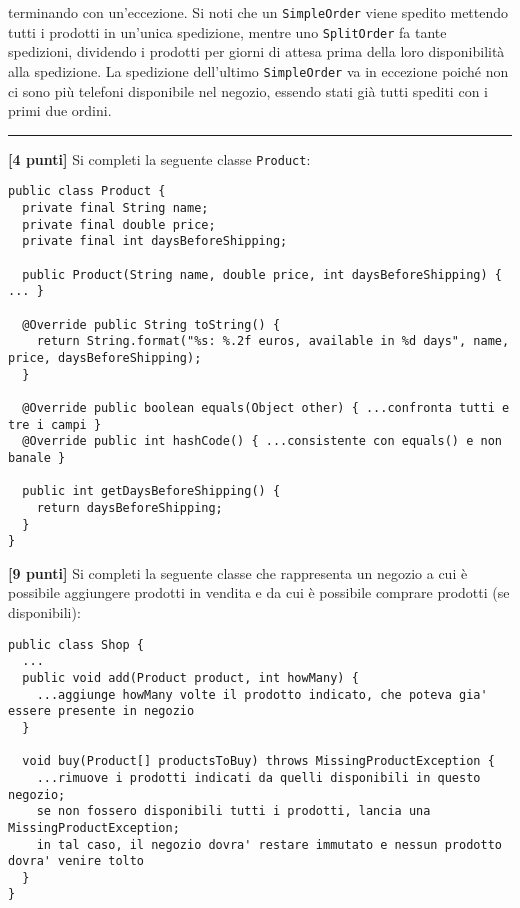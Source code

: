 \documentclass{article}[10pt]
\newcounter{esnu}
\newenvironment{esercizio}{\medskip \noindent {\bf Esercizio\addtocounter{esnu}{1} \arabic{esnu}}}{}
\begin{document}
\noindent
terminando con un'eccezione. Si noti che un \texttt{SimpleOrder} viene spedito mettendo
tutti i prodotti in un'unica spedizione, mentre uno \texttt{SplitOrder} fa tante spedizioni,
dividendo i prodotti per giorni di attesa prima della loro disponibilit\`a alla spedizione.
La spedizione dell'ultimo \texttt{SimpleOrder} va in eccezione poich\'e non ci sono pi\`u
telefoni disponibile nel negozio, essendo stati gi\`a tutti spediti con i primi due ordini.

\vspace*{2ex}
\hrule

\begin{esercizio}
\textbf{[4 punti]}
Si completi la seguente classe \texttt{Product}:
%
{\small\begin{verbatim}
public class Product {
  private final String name;
  private final double price;
  private final int daysBeforeShipping;

  public Product(String name, double price, int daysBeforeShipping) { ... }

  @Override public String toString() {
    return String.format("%s: %.2f euros, available in %d days", name, price, daysBeforeShipping);
  }

  @Override public boolean equals(Object other) { ...confronta tutti e tre i campi }
  @Override public int hashCode() { ...consistente con equals() e non banale }

  public int getDaysBeforeShipping() {
    return daysBeforeShipping;
  }
}
\end{verbatim}}
%
\end{esercizio}

\begin{esercizio}
\textbf{[9 punti]}
Si completi la seguente classe che rappresenta un negozio a cui \`e possibile aggiungere prodotti
in vendita e da cui \`e possibile comprare prodotti (se disponibili):

{\small\begin{verbatim}
public class Shop {
  ...
  public void add(Product product, int howMany) {
    ...aggiunge howMany volte il prodotto indicato, che poteva gia' essere presente in negozio
  }

  void buy(Product[] productsToBuy) throws MissingProductException {
    ...rimuove i prodotti indicati da quelli disponibili in questo negozio;
    se non fossero disponibili tutti i prodotti, lancia una MissingProductException;
    in tal caso, il negozio dovra' restare immutato e nessun prodotto dovra' venire tolto
  }
}
\end{verbatim}}
%
\end{esercizio}
\end{document}
